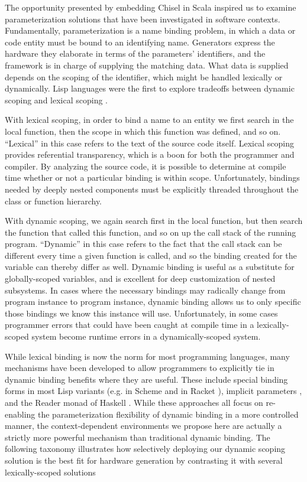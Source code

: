 The opportunity presented by embedding Chisel in Scala inspired us to examine parameterization solutions that have been investigated in software contexts.
Fundamentally, parameterization is a name binding problem, in which a data or code entity must be bound to an identifying name.
Generators express the hardware they elaborate in terms of the parameters' identifiers, and the framework is in charge of supplying the matching data.
What data is supplied depends on the scoping of the identifier, which might be handled lexically or dynamically.
Lisp languages were the first to explore tradeoffs between dynamic scoping and lexical scoping \cite{gordon}.

With lexical scoping, in order to bind a name to an entity we first search in the local function, then the scope in which this function was defined, and so on.
``Lexical'' in this case refers to the text of the source code itself.
Lexical scoping provides referential transparency, which is a boon for both the programmer and compiler.
By analyzing the source code, it is possible to determine at compile time whether or not a particular binding is within scope.
Unfortunately, bindings needed by deeply nested components must be explicitly threaded throughout the class or function hierarchy.

With dynamic scoping, we again search first in the local function, but then search the function that called this function, and so on up the call stack of the running program.
``Dynamic'' in this case refers to the fact that the call stack can be different every time a given function is called, and so the binding created for the variable can thereby differ as well.
Dynamic binding is useful as a substitute for globally-scoped variables, and is excellent for deep customization of nested subsystems.
In cases where the necessary bindings may radically change from program instance to program instance, dynamic binding allows us to only specific those bindings we know this instance will use.
Unfortunately, in some cases programmer errors that could have been caught at compile time in a lexically-scoped system become runtime errors in a dynamically-scoped system.

While lexical binding is now the norm for most programming languages, many mechanisms have been developed to allow programmers to explicitly tie in dynamic binding benefits where they are useful.
These include special binding forms in most Lisp variants
(e.g.  in Scheme \cite{steele} and  in Racket \cite{flatt2013racket}),
implicit parameters \cite{lewis2000implicit}, and the Reader monad of Haskell \cite{jones1995functional}.
While these approaches all focus on re-enabling the parameterization flexibility of dynamic binding in a more controlled manner, 
the context-dependent environments we propose here are actually a strictly more powerful mechanism than traditional dynamic binding. 
The following taxonomy illustrates how selectively deploying our dynamic scoping solution is the best fit for hardware generation by contrasting it
with several lexically-scoped solutions

